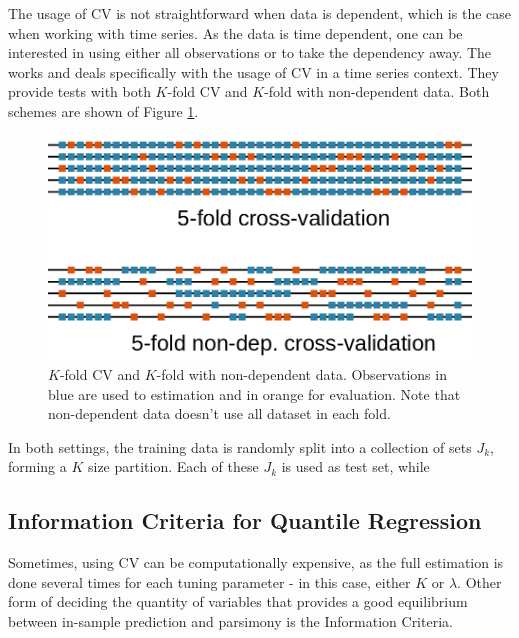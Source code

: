 The usage of CV is not straightforward when data is dependent, which is the case when working with time series. As the data is time dependent, one can be interested in using either all observations or to take the dependency away. The works
\cite{bergmeir_note_2017} and \cite{bergmeir_use_2012} deals specifically with the usage of CV in a time series context. They provide tests with both $K$-fold CV and $K$-fold with non-dependent data. Both schemes are shown of Figure \ref{fig:cross-validation-scheme}.
\begin{figure}
	\centering
	\includegraphics[width=0.9\linewidth]{../Figuras/Cross-validation-scheme}
	\caption{$K$-fold CV and $K$-fold with non-dependent data. Observations in blue are used to estimation and in orange for evaluation. Note that non-dependent data doesn't use all dataset in each fold.}
	\label{fig:cross-validation-scheme}
\end{figure}
In both settings, the training data is randomly split into a collection of sets $J_k$, forming a $K$ size partition. Each of these $J_k$ is used as test set, while 



\subsection{Information Criteria for Quantile Regression}
Sometimes, using CV can be computationally expensive, as the full estimation is done several times for each tuning parameter - in this case, either $K$ or $\lambda$. Other form of deciding the quantity of variables that provides a good equilibrium between in-sample prediction and parsimony is the Information Criteria.

